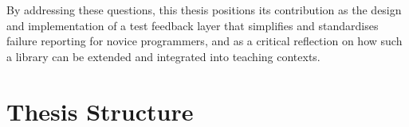 \noindent By addressing these questions, this thesis positions its contribution as the design and implementation of a test feedback layer that simplifies and
standardises failure reporting for novice programmers, and as a critical reflection on how such a library can be extended and integrated into teaching contexts.


\section{Thesis Structure} %
\label{sec:intro-structure}






